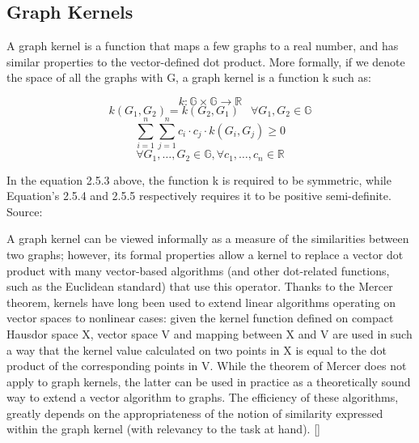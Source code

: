 \subsection{Graph Kernels}
A graph kernel is a function that maps a few graphs to a real number, and has similar properties to the vector-defined dot product. More formally, if we denote the space of all the graphs with G, a graph kernel is a function k such as:

\begin{equation}
k: \mathbb{G} \times \mathbb{G} \longrightarrow \mathbb{R}
\end{equation}
\begin{equation}
k\left(G_{1}, G_{2}\right)=k\left(G_{2}, G_{1}\right) \quad \forall G_{1}, G_{2} \in \mathbb{G}
\end{equation}
\begin{equation}
\sum_{i=1}^{n} \sum_{j=1}^{n} c_{i} \cdot c_{j} \cdot k\left(G_{i}, G_{j}\right) \geq 0
\end{equation}
\begin{equation}
\forall G_{1}, \ldots, G_{2} \in \mathbb{G}, \forall c_{1}, \ldots, c_{n} \in \mathbb{R}
\end{equation}

In the equation 2.5.3 above, the function k is required to be symmetric, while Equation's 2.5.4 and 2.5.5 respectively requires it to be positive semi-definite. Source: \cite{Foggia:2014}

A graph kernel can be viewed informally as a measure of the similarities between two graphs; however, its formal properties allow a kernel to replace a vector dot product with many vector-based algorithms (and other dot-related functions, such as the Euclidean standard) that use this operator. Thanks to the Mercer theorem, kernels have long been used to extend linear algorithms operating on vector spaces to nonlinear cases: given the kernel function defined on compact Hausdor space X, vector space V and mapping between X and V are used in such a way that the kernel value calculated on two points in X is equal to the dot product of the corresponding points in V. While the theorem of Mercer does not apply to graph kernels, the latter can be used in practice as a theoretically sound way to extend a vector algorithm to graphs. The efficiency of these algorithms, greatly depends on the appropriateness of the notion of similarity expressed within the graph kernel (with relevancy to the task at hand). [\cite{Foggia:2014}] 


